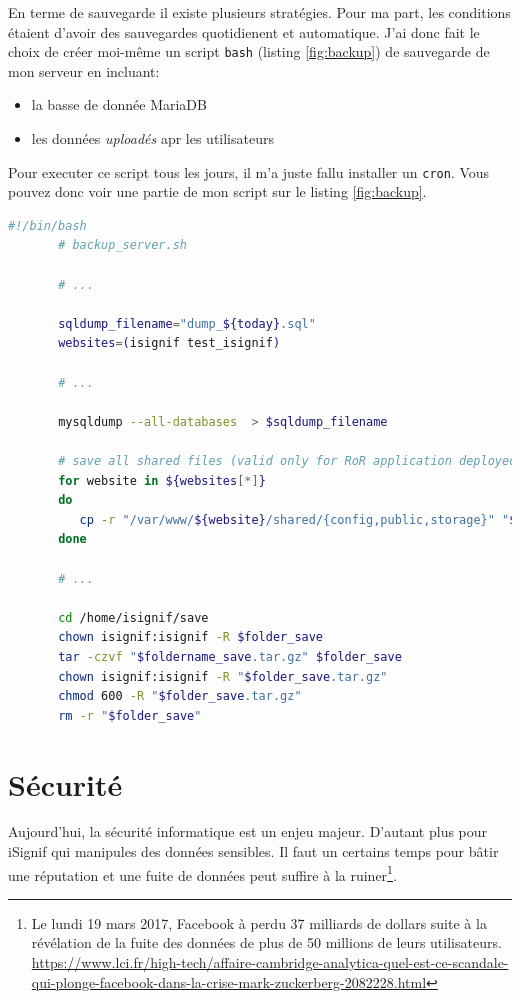 \documentclass[]{report}
\begin{document}
    En terme de sauvegarde il existe plusieurs stratégies. Pour ma part, les conditions étaient d'avoir des sauvegardes quotidienent et automatique. J'ai donc fait le choix de créer moi-même un script \verb|bash| (listing \ref{fig:backup}) de sauvegarde de mon serveur en incluant:

    \begin{itemize}
      \item la basse de donnée MariaDB
      \item les données \textit{uploadés} apr les utilisateurs
    \end{itemize}

    Pour executer ce script tous les jours, il m'a juste fallu installer un \verb|cron|. Vous pouvez donc voir une partie de mon script sur le listing \ref{fig:backup}.

     \begin{scriptsize}
       \begin{lstlisting}[language=bash, label={fig:backup}, caption={Script de sauvegarde automatique des données du serveur}]
       #!/bin/bash
       # backup_server.sh

       # ...

       sqldump_filename="dump_${today}.sql"
       websites=(isignif test_isignif)

       # ...

       mysqldump --all-databases  > $sqldump_filename

       # save all shared files (valid only for RoR application deployed with Capistrano)
       for website in ${websites[*]}
       do
          cp -r "/var/www/${website}/shared/{config,public,storage}" "${website}/shared/"
       done

       # ...

       cd /home/isignif/save
       chown isignif:isignif -R $folder_save
       tar -czvf "$foldername_save.tar.gz" $folder_save
       chown isignif:isignif -R "$folder_save.tar.gz"
       chmod 600 -R "$folder_save.tar.gz"
       rm -r "$folder_save"
       \end{lstlisting}
     \end{scriptsize}

\chapter{Sécurité}

  Aujourd'hui, la sécurité informatique est un enjeu majeur. D'autant plus pour iSignif qui manipules des données sensibles. Il faut un certains temps pour bâtir une réputation et une fuite de données peut suffire à la ruiner\footnote{Le lundi 19 mars 2017, Facebook à perdu 37 milliards de dollars suite à la révélation de la fuite des données de plus de 50 millions de leurs utilisateurs.  \url{https://www.lci.fr/high-tech/affaire-cambridge-analytica-quel-est-ce-scandale-qui-plonge-facebook-dans-la-crise-mark-zuckerberg-2082228.html}}.
\end{document}
